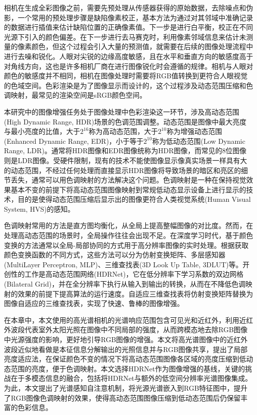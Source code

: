 \documentclass[
    type = master, %
    degree = academic,        %
    decl-page,  %
  ]{njuthesis}
\begin{document}
相机在生成全彩图像之前，需要先预处理从传感器获得的原始数据，去除噪点和伪影，一个常用的预处理步骤是缺陷像素校正，基本方法为通过对其邻域中准确记录的数据进行插值来估计缺陷位置的正确像素值。下一步是进行白平衡，校正在不同光源下引入的颜色偏差。在下一步进行去马赛克时，利用像素邻域信息来估计未测量的像素颜色，但这个过程会引入大量的预测值，就需要在后续的图像处理流程中进行去噪和锐化。人眼对尖锐的边缘高度敏感，且在水平和垂直方向的敏感度高于对角线方向，这也是许多相机厂商在进行图像锐化时会遵循的规律\cite{ramanath2005color}。相机与人眼对颜色的敏感度并不相同，相机在图像处理时需要将RGB值转换到更符合人眼视觉的色域空间。色彩渲染是为了图像显示而设计的，这个过程涉及动态范围压缩和色调映射，最常见的渲染空间是sRGB颜色空间\cite{international1999multimedia}。


本研究中的图像增强任务处于图像处理中色彩渲染这一环节，涉及高动态范围(High Dynamic Range, HDR)场景的色调范围调整。动态范围是图像中最大亮度与最小亮度的比值，大于$2^{16}$称为高动态范围，大于$2^{10}$称为增强动态范围(Enhanced Dynamic Range, EDR)，小于等于$2^{10}$称为低动态范围(Low Dynamic Range, LDR)。通常将HDR图像和EDR图像统称为HDR图像，而常见的8位图像则是LDR图像\cite{han2023high}。受硬件限制，现有的技术不能使图像显示像真实场景一样具有大的动态范围，不经过任何处理而直接显示HDR图像将导致场景的暗区和亮区的细节丢失，通常可以用色调映射的方法解决这个问题。色调映射是一种在保持视觉效果基本不变的前提下将高动态范围图像映射到常规低动态显示设备上进行显示的技术\cite{朱仲杰2023宏微观信息增强与色彩校正的高效色调映射}，目的是使得动态范围压缩后显示出的图像更符合人类视觉系统(Human Visual System, HVS)的感知。

色调映射常用的方法是直方图均衡化\cite{J21}，从全局上提高整幅图像的对比度。然而，在处理高动态范围的场景时，全局操作往往会出现不足。在深度学习时代，基于颜色变换的方法通常以全局-局部协同的方式用于高分辨率图像的实时处理。根据获取颜色变换函数的不同方式，这些方法可以分为仿射变换矩阵\cite{J11,J33}、多层感知器(MultiLayer Perceptron, MLP)\cite{J14}、三维查找表(3D Look Up Table, 3D\;LUT)\cite{J35,J38,J40}等。开创性的工作是高动态范围网络(HDRNet)\cite{J11}，它在低分辨率下学习系数的双边网格(Bilateral Grid)，并在全分辨率下执行从输入到输出的转换，从而在不降低色调映射的效果的前提下提高算法的运行速度。自适应三维查找表\cite{J38}将仿射变换矩阵替换为图像自适应的三维查找表，实现了快速、鲁棒的图像增强。

在本章中，本文使用的高光谱相机的光谱响应范围包含可见光和近红外，利用近红外波段代表室外太阳光照在图像中不同局部的强度，从而跨模态地去除RGB图像中光源强度的影响，更好地引导RGB图像的增强。本文将高光谱图像中的近红外波段近似地看做是本征信息分解输出的光照信息并与RGB图像共享，提出了局部亮度适应法，在保证颜色不变的情况下将高动态范围图像各区域的亮度压缩到低动态范围的亮度，便于色调映射。本文选择HDRNet作为图像增强的基线，关键的挑战在于多模态信息的融合，包括将HDRNet与额外的低空间分辨率光谱图像集成。为此，本文提出了光谱感知自注意机制，将光源光谱嵌入到RGB特征图中，提升了RGB图像色调映射的效果，使得高动态范围图像压缩到低动态范围后仍保留丰富的色彩信息。
\end{document}
